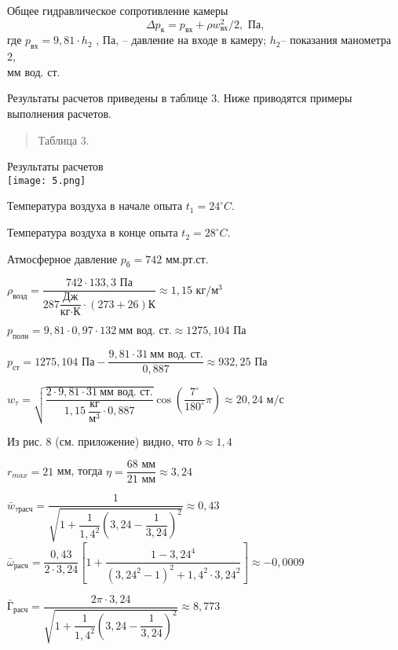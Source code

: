\documentclass[12pt,a4paper]{article}
\begin{document}
Общее гидравлическое сопротивление камеры
\begin{equation}
\Delta p_{\text{к}}=p_{\text{вх}}  +\rho w^2_{\text{вх}}/2, \text{ Па,}
\end{equation}
где $p_{\text{вх}} = 9,81\cdot h_2$ , Па, – давление на входе в камеру;
$h_2$– показания
манометра 2,\\ мм вод. ст.

Результаты расчетов приведены в таблице 3. Ниже приводятся примеры выполнения расчетов.

\begin{quote}
\flushright Таблица 3.
\end{quote}
\begin{center}
Результаты расчетов\\
\vspace{0.1cm}
\texttt{[image: 5.png]}
\end{center}


Температура воздуха в начале опыта $t_1 = 24^\circ C.$

Температура воздуха в конце опыта $t_2 = 28^\circ C.$

Атмосферное давление $p_{\text{б}} = 742$ мм.рт.ст.
\begin{spacing}{2.5}
$\rho_{\text{возд}} = \dfrac{742 \cdot 133,3 \text{ Па}}{287\dfrac{\text{Дж}}{\text{кг$\cdot$К}}\cdot(273+26)\text{К}} \approx 1,15 \text{ кг/м$^3$}$

$p_{\text{полн}} = 9,81 \cdot 0,97 \cdot 132\ \text{мм вод. ст.} \approx 1275,104 \text{ Па}$

$p_{\text{ст}} =1275,104 \text{ Па} - \dfrac{ 9,81\cdot 31\ \text{мм вод. ст.}}{0,887} \approx 932,25 \text{ Па}$

$w_{\tau} = \sqrt{\dfrac{2\cdot 9,81 \cdot 31\ \text{мм вод. ст.} }{1,15\ \dfrac{\text{кг}}{\text{м$^3$}}\cdot 0,887}}\cos \left(\dfrac{7^\circ}{180^\circ}\pi \right) \approx 20,24 \text{ м/с}$

Из рис. 8 (см. приложение) видно, что $b \approx 1,4$

$r_{max} = 21$ мм, тогда $\eta = \dfrac{68\text{ мм}}{21 \text{ мм}} \approx 3,24$

$\bar w_{\tau\text{расч}} = \dfrac{1}{\sqrt{1+\dfrac{1}{1,4^2}\left(3,24 - \dfrac{1}{3,24}\right)^2}} \approx 0,43$
\\

$\bar \omega_{\text{расч}}= \dfrac{0,43}{2\cdot 3,24 }\left[1+\dfrac{1-3,24^4}{\left(3,24^2-1\right)^2 + 1,4^2\cdot3,24^2} \right] \approx -0,0009$
\end{spacing}
\begin{spacing}{2.0}
$\bar {\text{Г}}_{\text{расч}}= \dfrac{2\pi \cdot 3,24 }{\sqrt{1+\dfrac{1}{1,4^2}\left(3,24 - {\dfrac{1}{3,24}}\right)^2}} \approx 8,773$
\end{spacing}
\end{document}

